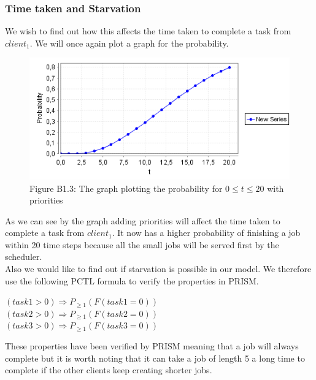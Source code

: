 \documentclass[12pt]{report}
\begin{document}
\subsubsection*{Time taken and Starvation}
We wish to find out how this affects the time taken to complete a task from $client_1$. We will once again plot a graph for the probability.
\begin{figure}[H]
	\centering
	\includegraphics[scale=0.75]{../GFX/B1-2b.png}\\
	Figure B1.3: The graph plotting the probability for $0 \leq t \leq 20$ with priorities
\end{figure}
As we can see by the graph adding priorities will affect the time taken to complete a task from $client_1$. It now has a higher probability of finishing a job within 20 time steps because all the small jobs will be served first by the scheduler.
\\Also we would like to find out if starvation is possible in our model. We therefore use the following PCTL formula to verify the properties in PRISM.
\begin{center}
$(task1 > 0) \Rightarrow P_{\geq 1}(F(task1 = 0))$\\
$(task2 > 0) \Rightarrow P_{\geq 1}(F(task2 = 0))$\\
$(task3 > 0) \Rightarrow P_{\geq 1} (F(task3 = 0))$
\end{center}
These properties have been verified by PRISM meaning that a job will always complete but it is worth noting that it can take a job of length 5 a long time to complete if the other clients keep creating shorter jobs.
\end{document}
